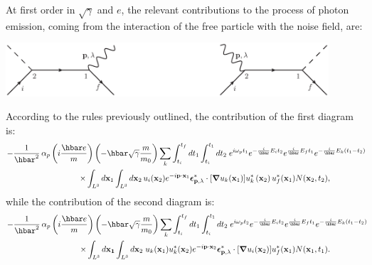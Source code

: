 \documentclass[12pt,onecolumn,amssymb,nofootinbib]{revtex4-2} %
\newcommand*{\boldvec}[1]{\ensuremath{\boldsymbol{#1}}}%
\let\vec\boldvec%
\begin{document}
At first order in $\sqrt{\gamma}$ and $e$, the relevant contributions to the process of photon
emission, coming from the interaction of the free particle with the noise
field, are:
\begin{center}
{\includegraphics[width=12cm, keepaspectratio]{diagrams1-2.eps}}
\end{center}
According to the rules previously outlined, the contribution of the first
diagram is:
\begin{eqnarray} \label{eq:hetryukeqry}
\lefteqn{-\frac{1}{\hbar^{2}}\,\alpha_{p}\left(i\frac{\hbar
e}{m}\right)\left(-\hbar\sqrt{\gamma}\frac{
m}{m_{0}}\right)\underset{k}{\sum}\int_{t_{i}}^{t_{f}}dt_{1}
\int_{t_{i}}^{t_{1}}dt_{2}\;
e^{i\omega_{p}t_{1}}e^{-\frac{i}{\hbar}E_{i}t_{2}}
e^{\frac{i}{\hbar}E_{f}t_{1}}e^{-\frac{i}{\hbar}E_{k}\left(t_{1}-t_{2}\right)}}
\qquad\qquad\qquad\qquad\nonumber \\
& &
\times \int_{L^3} d\mathbf{x}_{1} \int_{L^3} d\mathbf{x}_{2}\, u_{i}(\mathbf{x}_{2}) e^{-i
\mathbf{p}
\cdot\mathbf{x}_{1}} \vec{\epsilon}_{\mathbf{p},\lambda}^{*} \cdot [\vec{\nabla}u_{k}(\mathbf
{x}_{1})]
u_{k}^{*}\left(\mathbf{x}_{2}\right)
  u_{f}^{*}(\mathbf{x}_{1}) N({\bf x}_2, t_2),
\qquad\qquad
\end{eqnarray}
while the contribution of the second diagram is:
\begin{eqnarray}
\lefteqn{-\frac{1}{\hbar^{2}}\,\alpha_{p}\left(i\frac{\hbar
e}{m}\right)\left(-\hbar\sqrt{\gamma}\frac{
m}{m_{0}}\right)\underset{k}{\sum}\int_{t_{i}}^{t_{f}}dt_{1}
\int_{t_{i}}^{t_{1}}dt_{2}\;
e^{i\omega_{p}t_{2}}e^{-\frac{i}{\hbar}E_{i}t_{2}}
e^{\frac{i}{\hbar}E_{f}t_{1}}e^{-\frac{i}{\hbar}E_{k}\left(t_{1}-t_{2}\right)}}
\qquad\qquad\qquad\qquad\nonumber \\
& &
\times \int_{L^3} d\mathbf{x_{1}} \int_{L^3} d\mathbf{x}_{2}\; u_{k}(\mathbf{x}_{1}) u_{k}^
{*}(\mathbf{x}_{2}) e^{-i\mathbf{p}
\cdot\mathbf{x}_{2}} \vec{\epsilon}_{\mathbf{p},\lambda}^{*} \cdot
[\vec{\nabla} u_{i}(\mathbf{x}_{2})] u_{f}^{*}(\mathbf{x}_{1}) N({\bf x}_1, t_1).
\qquad\qquad
\end{eqnarray}
\end{document}
